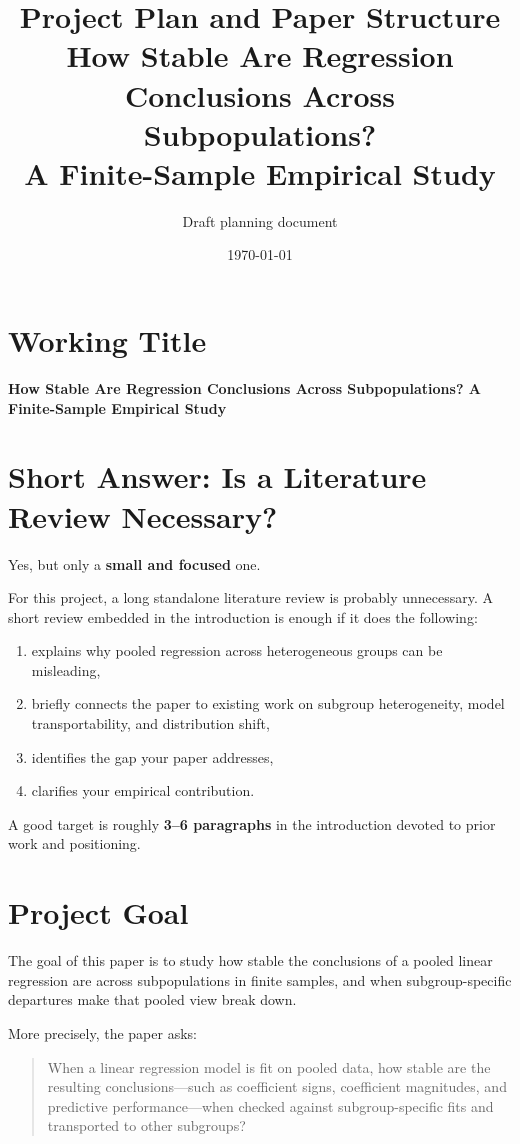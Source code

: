 \documentclass[11pt]{article}
\title{\textbf{Project Plan and Paper Structure}\\
How Stable Are Regression Conclusions Across Subpopulations?\\
A Finite-Sample Empirical Study}
\author{Draft planning document}
\date{\today}
\begin{document}
\maketitle

\section{Working Title}
\textbf{How Stable Are Regression Conclusions Across Subpopulations? A Finite-Sample Empirical Study}

\section{Short Answer: Is a Literature Review Necessary?}
Yes, but only a \textbf{small and focused} one.

For this project, a long standalone literature review is probably unnecessary. A short review embedded in the introduction is enough if it does the following:
\begin{enumerate}[label=(\arabic*)]
    \item explains why pooled regression across heterogeneous groups can be misleading,
    \item briefly connects the paper to existing work on subgroup heterogeneity, model transportability, and distribution shift,
    \item identifies the gap your paper addresses,
    \item clarifies your empirical contribution.
\end{enumerate}

A good target is roughly \textbf{3--6 paragraphs} in the introduction devoted to prior work and positioning.

\section{Project Goal}
The goal of this paper is to study how stable the conclusions of a pooled linear regression are across subpopulations in finite samples, and when subgroup-specific departures make that pooled view break down.

More precisely, the paper asks:
\begin{quote}
When a linear regression model is fit on pooled data, how stable are the resulting conclusions---such as coefficient signs, coefficient magnitudes, and predictive performance---when checked against subgroup-specific fits and transported to other subgroups?
\end{quote}
\end{document}
